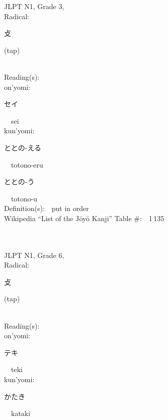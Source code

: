 \begin{multicols}{2}
{JLPT N1, Grade 3, \\Radical:\ \ {\begin{CJK}{UTF8}{min} 攴 \end{CJK}} (tap) } \\
Reading(s):\ \ \\
{\hspace*{1em}}on'yomi:\ \ \\
{\hspace*{2em}}{\begin{CJK}{UTF8}{min} セイ \end{CJK}}\ \ sei\ \ \\
{\hspace*{1em}}kun'yomi:\ \ \\
{\hspace*{2em}}{\begin{CJK}{UTF8}{min} ととの-える \end{CJK}}\ \ totono-eru\ \ \\
{\hspace*{2em}}{\begin{CJK}{UTF8}{min} ととの-う \end{CJK}}\ \ totono-u\ \ \\
Definition(s):\ \ put in order \\
Wikipedia ``List of the J\=oy\=o Kanji'' Table \#:\ \ 1\,135 \\
\ \ \\
{\fontsize{34pt}{40pt}  }\ \ \\  %
{JLPT N1, Grade 6, \\Radical:\ \ {\begin{CJK}{UTF8}{min} 攴 \end{CJK}} (tap) } \\
Reading(s):\ \ \\
{\hspace*{1em}}on'yomi:\ \ \\
{\hspace*{2em}}{\begin{CJK}{UTF8}{min} テキ \end{CJK}}\ \ teki\ \ \\
{\hspace*{1em}}kun'yomi:\ \ \\
{\hspace*{2em}}{\begin{CJK}{UTF8}{min} かたき \end{CJK}}\ \ kataki\ \ \\

\end{multicols}
